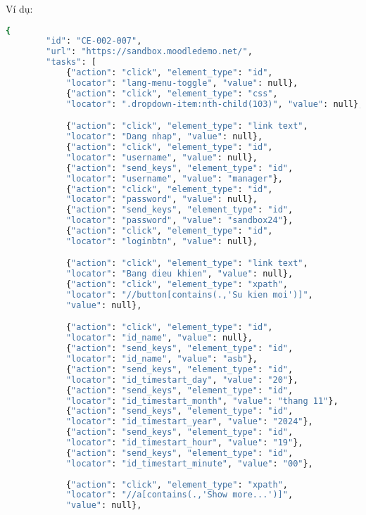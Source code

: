 Ví dụ:
\begin{lstlisting}[language=bash, caption={Ví dụ testcase CE-002-007 ở level 2}, breaklines=true]
    {
        "id": "CE-002-007",
        "url": "https://sandbox.moodledemo.net/",
        "tasks": [
            {"action": "click", "element_type": "id", 
            "locator": "lang-menu-toggle", "value": null},
            {"action": "click", "element_type": "css", 
            "locator": ".dropdown-item:nth-child(103)", "value": null},

            {"action": "click", "element_type": "link text", 
            "locator": "Dang nhap", "value": null},
            {"action": "click", "element_type": "id", 
            "locator": "username", "value": null},
            {"action": "send_keys", "element_type": "id", 
            "locator": "username", "value": "manager"},
            {"action": "click", "element_type": "id", 
            "locator": "password", "value": null},
            {"action": "send_keys", "element_type": "id", 
            "locator": "password", "value": "sandbox24"},
            {"action": "click", "element_type": "id", 
            "locator": "loginbtn", "value": null},

            {"action": "click", "element_type": "link text", 
            "locator": "Bang dieu khien", "value": null},
            {"action": "click", "element_type": "xpath", 
            "locator": "//button[contains(.,'Su kien moi')]", 
            "value": null},

            {"action": "click", "element_type": "id", 
            "locator": "id_name", "value": null},
            {"action": "send_keys", "element_type": "id", 
            "locator": "id_name", "value": "asb"},
            {"action": "send_keys", "element_type": "id", 
            "locator": "id_timestart_day", "value": "20"},
            {"action": "send_keys", "element_type": "id", 
            "locator": "id_timestart_month", "value": "thang 11"},
            {"action": "send_keys", "element_type": "id", 
            "locator": "id_timestart_year", "value": "2024"},
            {"action": "send_keys", "element_type": "id", 
            "locator": "id_timestart_hour", "value": "19"},
            {"action": "send_keys", "element_type": "id", 
            "locator": "id_timestart_minute", "value": "00"},
            
            {"action": "click", "element_type": "xpath", 
            "locator": "//a[contains(.,'Show more...')]", 
            "value": null},


\end{lstlisting}
